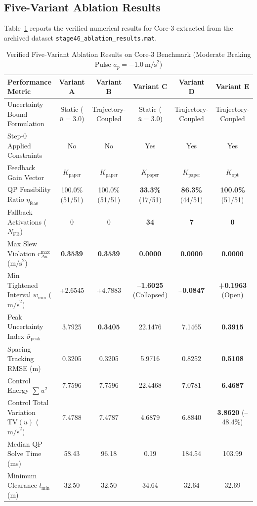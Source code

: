 \documentclass[journal]{IEEEtran}
\begin{document}
\subsection{Five-Variant Ablation Results}

Table~\ref{tab:ablation_core3} reports the verified numerical results for Core-3 extracted from the archived dataset \texttt{stage46\_ablation\_results.mat}.

\begin{table}[t]
\centering
\caption{Verified Five-Variant Ablation Results on Core-3 Benchmark (Moderate Braking Pulse $a_p = -1.0~\text{m/s}^2$)}
\label{tab:ablation_core3}
\begin{tabular}{lccccc}
\toprule
\textbf{Performance Metric} & \textbf{Variant A} & \textbf{Variant B} & \textbf{Variant C} & \textbf{Variant D} & \textbf{Variant E} \\
\midrule
Uncertainty Bound Formulation & Static ($\bar u = 3.0$) & Trajectory-Coupled & Static ($\bar u = 3.0$) & Trajectory-Coupled & Trajectory-Coupled \\
Step-0 Applied Constraints & No & No & Yes & Yes & Yes \\
Feedback Gain Vector & $K_{\mathrm{paper}}$ & $K_{\mathrm{paper}}$ & $K_{\mathrm{paper}}$ & $K_{\mathrm{paper}}$ & $K_{\mathrm{opt}}$ \\
\midrule
QP Feasibility Ratio $\eta_{\mathrm{feas}}$ & 100.0\% (51/51) & 100.0\% (51/51) & \textbf{33.3\%} (17/51) & \textbf{86.3\%} (44/51) & \textbf{100.0\%} (51/51) \\
Fallback Activations ($N_{\mathrm{FB}}$) & 0 & 0 & \textbf{34} & \textbf{7} & \textbf{0} \\
Max Slew Violation $r_{\Delta u}^{\max}$ ($\text{m/s}^2$) & \textbf{0.3539} & \textbf{0.3539} & \textbf{0.0000} & \textbf{0.0000} & \textbf{0.0000} \\
Min Tightened Interval $w_{\min}$ ($\text{m/s}^2$) & +2.6545 & +4.7883 & \textbf{--1.6025} (Collapsed) & \textbf{--0.0847} & \textbf{+0.1963} (Open) \\
Peak Uncertainty Index $\bar\sigma_{\mathrm{peak}}$ & 3.7925 & \textbf{0.3405} & 22.1476 & 7.1465 & \textbf{0.3915} \\
Spacing Tracking RMSE (m) & 0.3205 & 0.3205 & 5.9716 & 0.8252 & \textbf{0.5108} \\
Control Energy $\sum u^2$ & 7.7596 & 7.7596 & 22.4468 & 7.0781 & \textbf{6.4687} \\
Control Total Variation $\mathrm{TV}(u)$ ($\text{m/s}^2$) & 7.4788 & 7.4787 & 4.6879 & 6.8840 & \textbf{3.8620} (--48.4\%) \\
Median QP Solve Time (ms) & 58.43 & 96.18 & 0.19 & 184.54 & 103.99 \\
Minimum Clearance $l_{\min}$ (m) & 32.50 & 32.50 & 34.64 & 32.64 & 32.69 \\
\bottomrule
\end{tabular}
\end{table}
\end{document}
